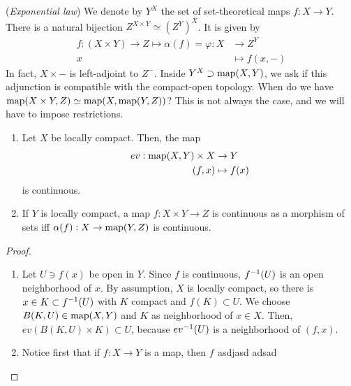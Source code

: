 \documentclass[main.tex]{subfiles}
\begin{document}
\begin{reminder}
	(\emph{Exponential law}) We denote by \(Y^X \) the set of set-theoretical maps \(f: X \to Y\).
	There is a natural bijection \(Z^{X \times Y} \simeq {\left(Z^{Y}\right)}^X \).
	It is given by
	\begin{align*}
		f: (X \times Y) \to Z \mapsto \alpha(f) = \varphi: X & \to Z^Y         \\
		x                                                    & \mapsto f(x, -)
	\end{align*}
	In fact, \(X \times -\) is left-adjoint to \(Z^- \).
	Inside \(Y^X \supset \operatorname{map}(X,Y)\), we ask if this adjunction is compatible with the compact-open topology.
	When do we have \(\operatorname{map}(X \times Y, Z) \simeq \operatorname{map}(X, \operatorname{map}(Y,Z))\)?
	This is not always the case, and we will have to impose restrictions.
\end{reminder}

\begin{prop}
	\begin{enumerate}
		\item Let \(X\) be locally compact.
		      Then, the map
		      \begin{align*}
			      ev: \operatorname{map}(X,Y) \times X & \to Y        \\
			      (f, x)                 & \mapsto f(x)
		      \end{align*}
		      is continuous.

		\item If \(Y\) is locally compact, a map \(f: X \times Y \to Z\) is continuous as a morphism of sets iff \(\alpha(f): X \to \operatorname{map}(Y,Z)\) is continuous.
	\end{enumerate}
\end{prop}

\begin{proof}
	\begin{enumerate}
		\item Let \(U \ni f(x)\) be open in \(Y\). Since \(f\) is continuous, \(f^{-1}(U)\) is an open neighborhood of \(x\).
		      By assumption, \(X\) is locally compact, so there is \(x \in K \subset f^{-1}(U)\) with \(K\) compact and \(f(K) \subset U\).
		      We choose \(B(K,U) \in \operatorname{map}(X,Y)\) and \(K\) as neighborhood of \(x \in X\).
		      Then, \(ev(B(K,U) \times K) \subset U\), because \(ev^{-1}(U)\) is a neighborhood of \((f,x)\).

		\item Notice first that if \(f: X \to Y\) is a map, then \(f_{}\)
                        asdjasd
    adsad

	\end{enumerate}
\end{proof}
\end{document}
